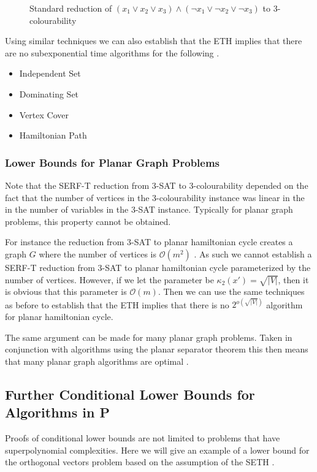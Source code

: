 \begin{figure}
\begin{tikzpicture}
    \end{tikzpicture}
    \caption[Reduction to 3-colourability]{Standard reduction of 
    $(x_1 \lor x_2 \lor x_3) \land (\neg x_1 \lor \neg x_2 \lor \neg x_3)$ to 3-colourability}
    \label{fig:reduce_3col}
\end{figure}

Using similar techniques we can also establish that the ETH implies that
there are no subexponential time algorithms for the following \cite{lokshtanov2013lower}.
\begin{itemize}
    \item Independent Set
    \item Dominating Set
    \item Vertex Cover
    \item Hamiltonian Path
\end{itemize}

\subsubsection{Lower Bounds for Planar Graph Problems}
Note that the SERF-T reduction from 3-SAT to 3-colourability depended on the
fact that the number of vertices in the
3-colourability instance was linear in the in the number of variables
in the 3-SAT instance. Typically for planar graph problems, this
property cannot be obtained.

For instance the reduction from 3-SAT to planar hamiltonian cycle 
creates a graph $G$ where the number of vertices is $\mathcal{O}(m^2)$ \cite{garey1976planar}.
As such we cannot establish a SERF-T reduction from 3-SAT to planar hamiltonian cycle 
parameterized by the number of vertices.
However, if we let the parameter be $\kappa_2(x') = \sqrt{|V|}$, then it is obvious that
this parameter is $\mathcal{O}(m)$. Then we can use the same techniques as before to
establish that the ETH implies that there is no $2^{o(\sqrt{|V|})}$ algorithm for planar
hamiltonian cycle.

The same argument can be made for many planar graph problems. Taken in conjunction
with algorithms using the planar separator theorem \cite{lipton1979separator} this
then means that many planar graph algorithms are optimal \cite{lipton1977applications}.

\subsection{Further Conditional Lower Bounds for Algorithms in P}
Proofs of conditional lower bounds are not limited to problems that
have superpolynomial complexities. Here we will give an example
of a lower bound for the orthogonal vectors problem based on the assumption
of the SETH \cite{williams2004new}.

